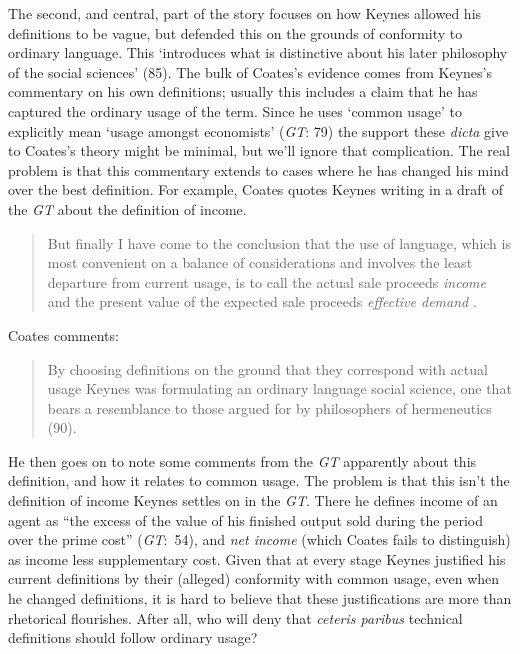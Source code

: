 The second, and central, part of the story focuses on how Keynes allowed his definitions to be vague, but defended this on the grounds of conformity to ordinary language. This `introduces what is distinctive about his later philosophy of the social sciences' (85). The bulk of Coates's evidence comes from Keynes's commentary on his own definitions; usually this includes a claim that he has captured the ordinary usage of the term. Since he uses `common usage' to explicitly mean `usage amongst economists' (\textit{GT}: 79) the support these \textit{dicta} give to Coates's theory might be minimal, but we'll ignore that complication. The real problem is that this commentary extends to cases where he has changed his mind over the best definition. For example, Coates quotes Keynes writing in a draft of the \textit{GT} about the definition of income.

\begin{quote}
But finally I have come to the conclusion that the use of language, which is most convenient on a balance of considerations and involves the least departure from current usage, is to call the actual sale proceeds \textit{income} and the present value of the expected sale proceeds \textit{effective demand} \cite[425]{Keynes1934}.
\end{quote}

\noindent Coates comments:

\begin{quote}
By choosing definitions on the ground that they correspond with actual usage Keynes was formulating an ordinary language social science, one that bears a resemblance to those argued for by philosophers of hermeneutics (90).
\end{quote}

\noindent He then goes on to note some comments from the \textit{GT} apparently about this definition, and how it relates to common usage. The problem is that this isn't the definition of income Keynes settles on in the \textit{GT}. There he defines income of an agent as ``the excess of the value of his finished output sold during the period over the prime cost'' (\textit{GT}:~54), and \textit{net income} (which Coates fails to distinguish) as income less supplementary cost. Given that at every stage Keynes justified his current definitions by their (alleged) conformity with common usage, even when he changed definitions, it is hard to believe that these justifications are more than rhetorical flourishes. After all, who will deny that \textit{ceteris paribus} technical definitions should follow ordinary usage? 


